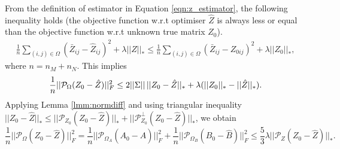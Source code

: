 \documentclass{article} %
\newcommand\mc{\mathcal} %
\begin{document}
From the definition of estimator in Equation \ref{eqn:z_estimator}, the following inequality holds (the objective function  w.r.t optimiser $\hat{Z}$ is always less or equal than the objective function w.r.t unknown true matrix $Z_0$).
\begin{align}
\frac{1}{n} \sum_{(i,j) \in \Omega}(\bar{Z}_{ij} - \hat{Z}_{ij})^2 + \lambda ||\hat{Z}||_* 
\leq \frac{1}{n} \sum_{(i,j) \in \Omega}(\bar{Z}_{ij} - {Z}_{0ij})^2 + \lambda ||Z_0||_*,
\end{align}
where $n = n_M + n_N$. This implies
\begin{equation}
\frac{1}{n}||\mathcal{P}_\Omega(Z_0 - \hat{Z}) ||_F^2 \leq 2||\Sigma||\,||Z_0 - \hat{Z}||_* + \lambda(||Z_0||_* - ||\hat{Z}||_*). \\
\end{equation}
Applying Lemma \ref{lmm:normdiff} and using triangular inequality $||Z_0 - \hat{Z}||_* \leq ||\mc{P}_{Z_0}(Z_0 - \hat{Z})||_* + ||\mc{P}_{Z_0}^\perp(Z_0 - \hat{Z})||_*$, we obtain
\begin{equation}
\frac{1}{n}||\mathcal{P}_\Omega(Z_0 - \hat{Z}) ||_F^2 = \frac{1}{n}||\mc{P}_{\Omega_A}(A_0-\hat{A})||_F^2 + \frac{1}{n}||\mc{P}_{\Omega_B}(B_0-\hat{B})||_F^2
\leq \frac{5}{3}\lambda ||\mc{P}_Z(Z_0-\hat{Z})||_*.
\label{eqn:tri}
\end{equation}
\end{document}
